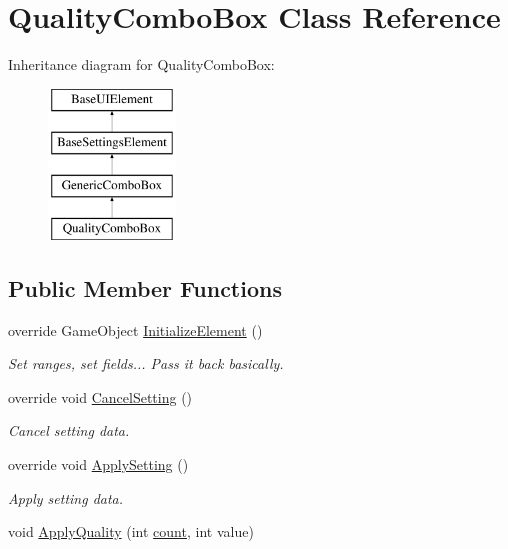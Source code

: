 \hypertarget{class_quality_combo_box}{}\section{Quality\+Combo\+Box Class Reference}
\label{class_quality_combo_box}
Inheritance diagram for Quality\+Combo\+Box\+:\begin{figure}[H]
\begin{center}
\leavevmode
\includegraphics[height=4.000000cm]{class_quality_combo_box}
\end{center}
\end{figure}
\subsection*{Public Member Functions}
\begin{DoxyCompactItemize}
\item 
override Game\+Object \hyperlink{class_quality_combo_box_a8f6e77ad23e7e937c023d4ad4f9aeaa4}{Initialize\+Element} ()
\begin{DoxyCompactList}\small\item\em Set ranges, set fields... Pass it back basically. \end{DoxyCompactList}\item 
override void \hyperlink{class_quality_combo_box_a04e70d34dd0b977690f593cfd4ecbe6b}{Cancel\+Setting} ()
\begin{DoxyCompactList}\small\item\em Cancel setting data. \end{DoxyCompactList}\item 
override void \hyperlink{class_quality_combo_box_a6f05c237068e72d2221a58425d17f402}{Apply\+Setting} ()
\begin{DoxyCompactList}\small\item\em Apply setting data. \end{DoxyCompactList}\item 
void \hyperlink{class_quality_combo_box_acec568a71ccbc0d4a9fd727371f5eb5b}{Apply\+Quality} (int \hyperlink{class_quality_combo_box_abef900f73a92b47a08e22be563a58515}{count}, int value)
\end{DoxyCompactItemize}
